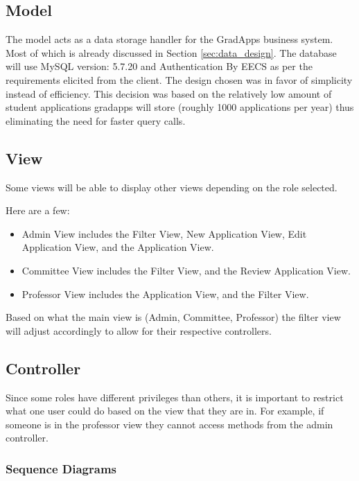 \documentclass[fontsize=12pt,paper=letter,twoside]{scrartcl}
\begin{document}
\subsection{Model}

The model acts as a data storage handler for the GradApps business system. Most of which is already discussed in Section \ref{sec:data_design}. The database will use MySQL version: 5.7.20 and Authentication By EECS as per the requirements elicited from the client. The design chosen was in favor of simplicity instead of efficiency. This decision was based on the relatively low amount of student applications gradapps will store (roughly 1000 applications per year) thus eliminating the need for faster query calls.

\subsection{View}
Some views will be able to display other views depending on the role selected.

\smallskip 
\noindent Here are a few:

\begin{itemize}
\item Admin View includes the Filter View, New Application View, Edit Application View,  and the Application View.
\item Committee View includes the Filter View, and the Review Application View.
\item Professor View includes the Application View, and the Filter View.
\end{itemize}

\noindent Based on what the main view is (Admin, Committee, Professor) the filter view will adjust accordingly to allow for their respective controllers.


\subsection{Controller}

Since some roles have different privileges than others, it is important to restrict what one user could do based on the view that they are in. For example, if someone is in the professor view they cannot access methods from the admin controller.

\subsubsection{Sequence Diagrams}
\end{document}

